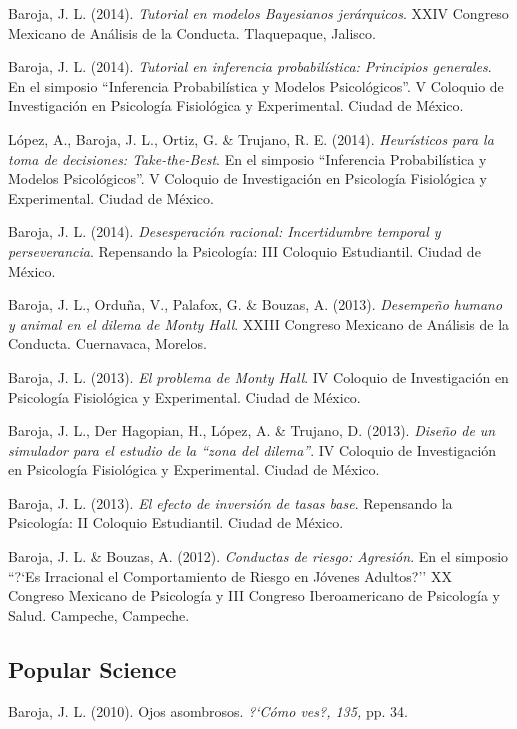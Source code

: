 \documentclass[letterpaper]{article}
\renewenvironment{itemize}{
  \begin{list}{}{
    \setlength{\leftmargin}{1.5em}
  }
}{
  \end{list}
}
\begin{document}
\begin{itemize}
	\item Baroja, J. L. (2014). \emph{Tutorial en modelos Bayesianos jerárquicos}. XXIV Congreso Mexicano de Análisis de la Conducta. Tlaquepaque, Jalisco.
	\item Baroja, J. L. (2014). \emph{Tutorial en inferencia probabilística: Principios generales}. En el simposio ``Inferencia Probabilística y Modelos Psicológicos''. V Coloquio de Investigación en Psicología Fisiológica y Experimental. Ciudad de México.
	\item López, A., Baroja, J. L., Ortiz, G. \& Trujano, R. E. (2014). \emph{Heurísticos para la toma de decisiones: Take-the-Best}. En el simposio ``Inferencia Probabilística y Modelos Psicológicos''. V Coloquio de Investigación en Psicología Fisiológica y Experimental. Ciudad de México.
	\item Baroja, J. L. (2014). \emph{Desesperación racional: Incertidumbre temporal y perseverancia}. Repensando la Psicología: III Coloquio Estudiantil. Ciudad de México.
	\item Baroja, J. L., Orduña, V., Palafox, G. \& Bouzas, A. (2013). \emph{Desempeño humano y animal en el dilema de Monty Hall}. XXIII Congreso Mexicano de Análisis de la Conducta. Cuernavaca, Morelos.
	\item Baroja, J. L. (2013). \emph{El problema de Monty Hall}. IV Coloquio de Investigación en Psicología Fisiológica y Experimental. Ciudad de México.
	\item Baroja, J. L., Der Hagopian, H., López, A. \& Trujano, D. (2013). \emph{Diseño de un simulador para el estudio de la ``zona del dilema''}. IV Coloquio de Investigación en Psicología Fisiológica y Experimental. Ciudad de México.
	\item Baroja, J. L. (2013). \emph{El efecto de inversión de tasas base}. Repensando la Psicología: II Coloquio Estudiantil. Ciudad de México.
	\item Baroja, J. L. \& Bouzas, A. (2012). \emph{Conductas de riesgo: Agresión}. En el simposio ``?`Es Irracional el Comportamiento de Riesgo en Jóvenes Adultos?'' XX Congreso Mexicano de Psicología y III Congreso Iberoamericano de Psicología y Salud. Campeche, Campeche.
\end{itemize}

\subsection*{Popular Science}
\begin{itemize}
\setlength\itemsep{-.25em}
\setlength{\itemindent}{-.125in}
	\item Baroja, J. L. (2010). Ojos asombrosos. \emph{?`Cómo ves?, 135,} pp. 34.
\end{itemize}
\end{document}
